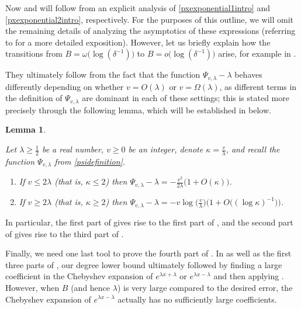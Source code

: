 \documentclass[10pt,a4paper]{article}
\theoremstyle{plain}\newtheorem{theorem}{Theorem}
\newtheorem{lemma}[theorem]{Lemma}
\theoremstyle{definition}
\begin{document}
    
    Now  and  will follow from an explicit analysis of \eqref{pxexponential1intro} and \eqref{pxexponential2intro}, respectively. For the purposes of this outline, we will omit the remaining details of analyzing the asymptotics of these expressions (referring to  for a more detailed exposition). However, let us briefly explain how the transitions from $B = \omega \big( \log (\delta^{-1}) \big)$ to $B = o \big( \log (\delta^{-1}) \big)$ arise, for example in . 
    
    They ultimately follow from the fact that the function $\Psi_{v, \lambda} - \lambda$ behaves differently depending on whether $v = O(\lambda)$ or $v = \Omega (\lambda)$, as different terms in the definition of $\Psi_{v, \lambda}$ are dominant in each of these settings; this is stated more precisely through the following lemma, which will be established in  below. 
	
		
	\begin{lemma}
	
	\label{psivlambdakappa} 
	
	Let $\lambda \ge \frac{1}{2}$ be a real number, $v \ge 0$ be an integer, denote $\kappa = \frac{v}{\lambda}$, and recall the function $\Psi_{v, \lambda}$ from \eqref{psidefinition}. 
	
	\begin{enumerate} 
	
	\item If $v \le 2 \lambda$ (that is, $\kappa \le 2$) then $\Psi_{v, \lambda} - \lambda = - \displaystyle\frac{v^2}{2 \lambda} \big( 1 + O(\kappa) \big)$.
	
	\item If $v \ge 2 \lambda$ (that is, $\kappa \ge 2$) then $\Psi_{v, \lambda} - \lambda= - v \log \Big( \displaystyle\frac{v}{\lambda} \Big) \Big( 1 + O \big( (\log \kappa)^{-1} \big) \Big)$.
	
	\end{enumerate}
	
	
	\end{lemma} 

    \noindent In particular, the first part of  gives rise to the first part of , and the second part of  gives rise to the third part of . 
    
    
    Finally, we need one last tool to prove the fourth part of . In  as well as the first three parts of , our degree lower bound ultimately followed by finding a large coefficient in the Chebyshev expansion of $e^{\lambda x + \lambda}$ or $e^{\lambda x - \lambda}$ and then applying . However, when $B$ (and hence $\lambda$) is very large compared to the desired error, the Chebyshev expansion of $e^{\lambda x - \lambda}$ actually has no sufficiently large coefficients.
    
\end{document}
